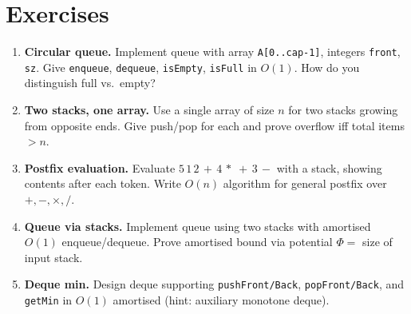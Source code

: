 \section{Exercises}
\label{sec:ch02-exercises}
\begin{enumerate}[label=E2.\arabic*, leftmargin=*, itemsep=0.7em]
    \item \textbf{Circular queue.} Implement queue with array \texttt{A[0..cap-1]}, integers \texttt{front}, \texttt{sz}. Give \texttt{enqueue}, \texttt{dequeue}, \texttt{isEmpty}, \texttt{isFull} in $O(1)$. How do you distinguish full vs.\ empty?
    \item \textbf{Two stacks, one array.} Use a single array of size $n$ for two stacks growing from opposite ends. Give push/pop for each and prove overflow iff total items $>n$.
    \item \textbf{Postfix evaluation.} Evaluate $5\,1\,2\,+\,4\,*\;+\,3\,-$ with a stack, showing contents after each token. Write $O(n)$ algorithm for general postfix over $+,-,\times,/ $.
    \item \textbf{Queue via stacks.} Implement queue using two stacks with amortised $O(1)$ enqueue/dequeue. Prove amortised bound via potential $\Phi=$ size of input stack.
    \item \textbf{Deque min.} Design deque supporting \texttt{pushFront/Back}, \texttt{popFront/Back}, and \texttt{getMin} in $O(1)$ amortised (hint: auxiliary monotone deque).
\end{enumerate}
